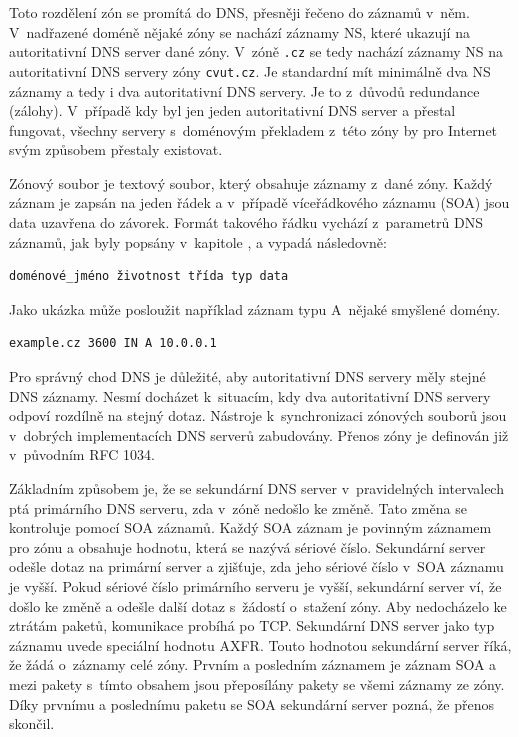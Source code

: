 \documentclass[thesis=M,czech]{src/FITthesis}[2019/12/23]
\begin{document}
Toto rozdělení zón se promítá do DNS, přesněji řečeno do záznamů v~něm. V~nadřazené doméně nějaké zóny se nachází záznamy NS, které ukazují na autoritativní DNS server dané zóny. V~zóně \texttt{.cz} se tedy nachází záznamy NS na autoritativní DNS servery zóny \texttt{cvut.cz}. Je standardní mít minimálně dva NS záznamy a tedy i dva autoritativní DNS servery. Je to z~důvodů redundance (zálohy). V~případě kdy byl jen jeden autoritativní DNS server a přestal fungovat, všechny servery s~doménovým překladem z~této zóny by pro Internet svým způsobem přestaly existovat.

Zónový soubor je textový soubor, který obsahuje záznamy z~dané zóny. Každý záznam je zapsán na jeden řádek a v~případě víceřádkového záznamu (SOA) jsou data uzavřena do závorek. Formát takového řádku vychází z~parametrů DNS záznamů, jak byly popsány v~kapitole , a vypadá následovně: 
\begin{verbatim}
doménové_jméno životnost třída typ data
\end{verbatim}

Jako ukázka může posloužit například záznam typu A~nějaké smyšlené domény. 

\begin{verbatim}
example.cz 3600 IN A 10.0.0.1
\end{verbatim}

Pro správný chod DNS je důležité, aby autoritativní DNS servery měly stejné DNS záznamy. Nesmí docházet k~situacím, kdy dva autoritativní DNS servery odpoví rozdílně na stejný dotaz. Nástroje k~synchronizaci zónových souborů jsou v~dobrých implementacích DNS serverů zabudovány. Přenos zóny je definován již v~původním RFC 1034. \cite{RFC1034}

Základním způsobem je, že se sekundární DNS server v~pravidelných intervalech ptá primárního DNS serveru, zda v~zóně nedošlo ke změně. Tato změna se kontroluje pomocí SOA záznamů. Každý SOA záznam je povinným záznamem pro zónu a obsahuje hodnotu, která se nazývá sériové číslo. \linebreak Sekundární server odešle dotaz na primární server a zjišťuje, zda jeho sériové číslo v~SOA záznamu je vyšší. Pokud sériové číslo primárního serveru je vyšší, sekundární server ví, že došlo ke změně a odešle další dotaz s~žádostí o~stažení zóny. Aby nedocházelo ke ztrátám paketů, komunikace probíhá po TCP. Sekundární DNS server jako typ záznamu uvede speciální hodnotu AXFR. Touto hodnotou sekundární server říká, že žádá o~záznamy celé zóny. Prvním a posledním záznamem je záznam SOA a mezi pakety s~tímto obsahem jsou přeposílány pakety se všemi záznamy ze zóny. Díky prvnímu a poslednímu paketu se SOA sekundární server pozná, že přenos skončil. 
\end{document}

